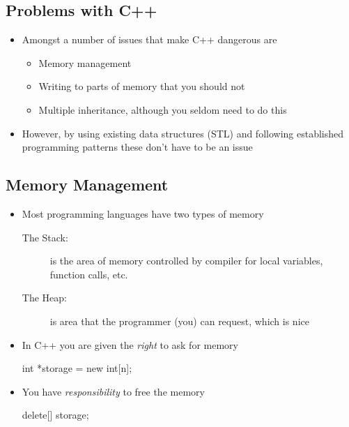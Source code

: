 
\begin{slide}
\section{Problems with C++}
  
\begin{PauseHighLight}
  \begin{itemize}
  \item Amongst a number of issues that make C++ dangerous are
    \begin{itemize}\squeeze
    \item Memory management
    \item Writing to parts of memory that you should not
    \item Multiple inheritance\pause, although you seldom need to do this\pauseb
    \end{itemize}
  \item However, by using existing data structures (STL) and following
    established programming patterns these don't have to be an issue\pause
  \end{itemize}
\end{PauseHighLight}

\end{slide}


\begin{slide}
\section{Memory Management}

\begin{PauseHighLight}
  \begin{itemize}
  \item Most programming languages have two types of memory
    \begin{description}
    \item[The Stack:] is the area of memory controlled by compiler for
      local variables, function calls, etc.\pause
    \item[The Heap:] is area that the programmer (you) can
      request\pause, which is nice\pauseb
    \end{description}
  \item In C++ you are given the \emph{right} to ask for memory
    \begin{cpp}
      int *storage = new int[n];
    \end{cpp}\pauseb
  \item You have \emph{responsibility} to free the memory
    \begin{cpp}
      delete[] storage;
    \end{cpp}\pauseb
  \end{itemize}
\end{PauseHighLight}

\end{slide}

